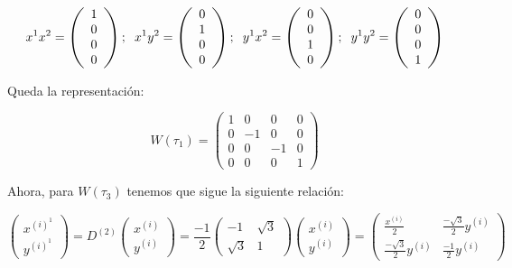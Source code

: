 \begin{enumerate}
\begin{enumerate}
$$x^1x^2=\left( \begin{array}{c}
 1  \\
 0 \\
 0 \\
 0
\end{array} \right ); \hspace{0.2cm} x^1y^2=\left( \begin{array}{c}
 0  \\
 1 \\
 0 \\
 0
\end{array} \right ); \hspace{0.2cm} y^1x^2=\left( \begin{array}{c}
 0  \\
 0 \\
 1 \\
 0
\end{array} \right ); \hspace{0.2cm} y^1y^2=\left( \begin{array}{c}
 0  \\
 0 \\
 0 \\
 1
\end{array} \right )$$

Queda la representación:

$$W(\tau _1)=\left (\begin{array}{cccc}
1  & 0 & 0 & 0 \\
0  & -1 & 0 & 0 \\
 0 & 0 & -1 & 0 \\
 0 & 0 & 0 & 1
\end{array} \right)$$

Ahora, para $W(\tau _3)$ tenemos que sigue la siguiente relación:

$$\left ( \begin{array}{c}
 x^{(i)^1}  \\
   y^{(i)^1}
\end{array}\right) = D^{(2)} \left ( \begin{array}{c}
 x^{(i)}  \\
   y^{(i)}
\end{array}\right)=\frac{-1}{2}\left ( \begin{array}{cc}
-1 & \sqrt{3} \\
   \sqrt{3} & 1
\end{array}\right)\left ( \begin{array}{c}
 x^{(i)}  \\
   y^{(i)}
\end{array}\right)= \left ( \begin{array}{cc}
 \frac{x^{(i)}}{2} & \frac{-\sqrt{3}}{2}y^{(i)}  \\
 \frac{-\sqrt{3}}{2}y^{(i)}  & \frac{-1}{2}y^{(i)}
\end{array}\right)$$


\end{enumerate}
\end{enumerate}
